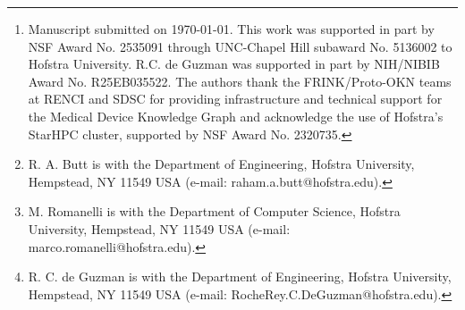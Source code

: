 \documentclass[journal,twoside,web]{ieeecolor2}
\begin{document}
\title{\customtitle}

\author{Raham A. Butt, Marco Romanelli, and Roche C. de Guzman
    \thanks{
        Manuscript submitted on \today.
        This work was supported in part by NSF Award No. 2535091 through UNC-Chapel Hill subaward No. 5136002 to Hofstra University.  R.C. de Guzman was supported in part by NIH/NIBIB Award No. R25EB035522.  The authors thank the FRINK/Proto-OKN teams at RENCI and SDSC for providing infrastructure and technical support for the Medical Device Knowledge Graph and acknowledge the use of Hofstra’s StarHPC cluster, supported by NSF Award No. 2320735.
    }
    \thanks{R. A. Butt is with the Department of Engineering, Hofstra University, Hempstead, NY 11549 USA (e-mail: raham.a.butt@hofstra.edu).}
    \thanks{M. Romanelli is with the Department of Computer Science, Hofstra University, Hempstead, NY 11549 USA (e-mail: marco.romanelli@hofstra.edu).}
    \thanks{R. C. de Guzman is with the Department of Engineering, Hofstra University, Hempstead, NY 11549 USA (e-mail: RocheRey.C.DeGuzman@hofstra.edu).}
}

\maketitle
\end{document}
